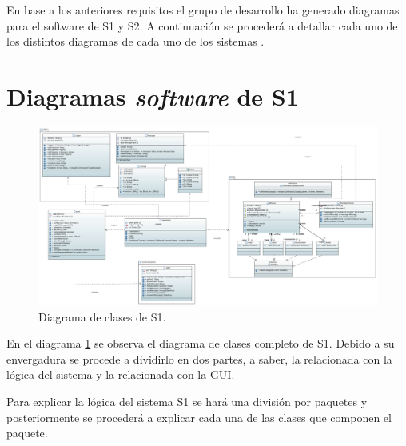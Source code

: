 
En base a los anteriores requisitos el grupo de desarrollo ha generado diagramas para el software de \ac{S1} y \ac{S2}. A continuación se procederá a detallar cada uno de los distintos diagramas de cada uno de los sistemas . 

\section{Diagramas \textit{software} de S1}

\begin{figure}[H]
    \centering
    \includegraphics[width=\linewidth]{pictures/S1ClassDiagram.PNG}
    \caption{Diagrama de clases de \ac{S1}.}
    \label{fig:diagrama_clases_s1}
\end{figure}

En el diagrama \ref{fig:diagrama_clases_s1} se observa el diagrama de clases completo de \ac{S1}. Debido a su envergadura se procede a dividirlo en dos partes, a saber, la relacionada con la lógica del sistema y la relacionada con la GUI.

Para explicar la lógica del sistema \ac{S1} se hará una división por paquetes y posteriormente se procederá a explicar cada una de las clases que componen el paquete.

